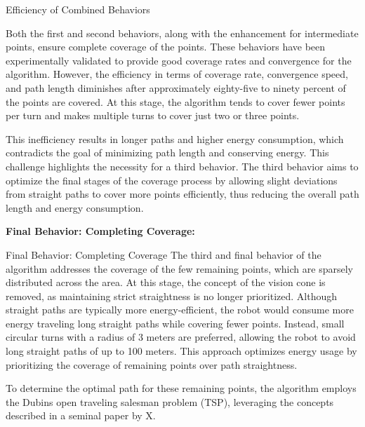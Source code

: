 \vspace*{6mm}   

Efficiency of Combined Behaviors

Both the first and second behaviors, along with the enhancement for intermediate points, ensure complete coverage of the points. These behaviors have been experimentally validated to provide good coverage rates and convergence for the algorithm. However, the efficiency in terms of coverage rate, convergence speed, and path length diminishes after approximately eighty-five to ninety percent of the points are covered. At this stage, the algorithm tends to cover fewer points per turn and makes multiple turns to cover just two or three points.

\vspace*{6mm}   

This inefficiency results in longer paths and higher energy consumption, which contradicts the goal of minimizing path length and conserving energy. This challenge highlights the necessity for a third behavior. The third behavior aims to optimize the final stages of the coverage process by allowing slight deviations from straight paths to cover more points efficiently, thus reducing the overall path length and energy consumption.

\vspace*{6mm}   





\textbf{Final Behavior: Completing Coverage: }


\vspace*{6mm}   

Final Behavior: Completing Coverage
The third and final behavior of the algorithm addresses the coverage of the few remaining points, which are sparsely distributed across the area. At this stage, the concept of the vision cone is removed, as maintaining strict straightness is no longer prioritized. Although straight paths are typically more energy-efficient, the robot would consume more energy traveling long straight paths while covering fewer points. Instead, small circular turns with a radius of 3 meters are preferred, allowing the robot to avoid long straight paths of up to 100 meters. This approach optimizes energy usage by prioritizing the coverage of remaining points over path straightness.

\vspace*{6mm}   

To determine the optimal path for these remaining points, the algorithm employs the Dubins open traveling salesman problem (TSP), leveraging the concepts described in a seminal paper by X.


